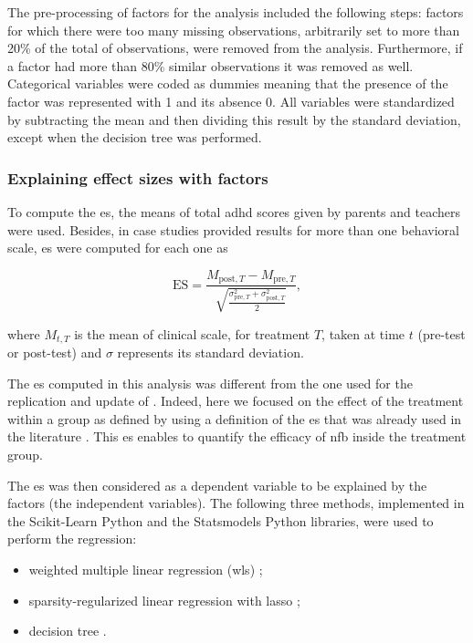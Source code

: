 The pre-processing of factors for the analysis included the following steps: factors for which there were too many 
missing observations, arbitrarily set to more than 20\% of the total of observations, were removed from the analysis. 
Furthermore, if a factor had more than 80\% similar observations it was removed as well. Categorical variables were 
coded as dummies meaning that the presence of the factor was represented with 1 and its absence 0. All variables 
were standardized by subtracting the mean and then dividing this result by the standard deviation, except when 
the decision tree was performed. 

\subsubsection{Explaining effect sizes with factors}

To compute the \gls{es}, the  means of total \gls{adhd} scores given by parents and teachers were used. Besides, 
in case studies provided results for more than one behavioral scale, \gls{es} were computed for each one as 

\begin{equation*}
\label{eq:factors_effect_size_within_subject}
\text{ES} = \frac{M_{\text{post},T} - M_{\text{pre},T}}{\sqrt{\frac{\sigma_{\text{pre},T}^2 + \sigma_{\text{post},T}^2}{2}}},
\end{equation*} 

where $M_{t,T}$ is the mean of clinical scale, for treatment $T$, taken at time $t$ (pre-test or post-test) and $\sigma$ represents 
its standard deviation.

The \gls{es} computed in this analysis was different from the one used for the replication and update of \citet{Cortese2016}. 
Indeed, here we focused on the effect of the treatment within a group as defined by \citet{Cohen1988} using a definition of 
the \gls{es} that was already used in the literature \citep{Arns2009, Maurizio2014, Strehl2017}. This \gls{es} enables to quantify 
the efficacy of \gls{nfb} inside the treatment group. 

The \gls{es} was then considered as a dependent variable to be explained by the factors (the independent variables). 
The following three methods, implemented in the Scikit-Learn Python \citep[0.18.1]{Pedregosa2011} and the Statsmodels Python
\citep[0.8.0]{Seabold2010} libraries, were used to perform the regression:
\begin{itemize}
\item weighted multiple linear regression (\gls{wls}) \citep{Montgomery2012};
	\item sparsity-regularized linear regression with \gls{lasso} \citep{Tibshirani1996};
	\item decision tree \citep{Quinlan1986}.
\end{itemize}

